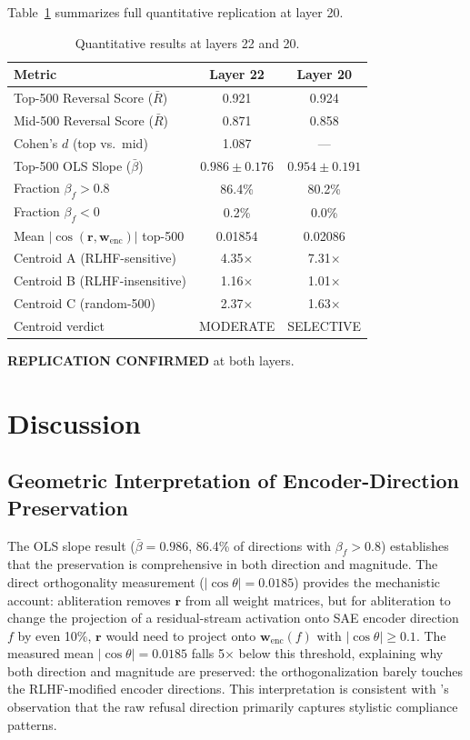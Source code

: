 \documentclass[11pt,letterpaper]{article}
\begin{document}
Table~\ref{tab:replication} summarizes full quantitative replication at layer 20.

\begin{table}[!htbp]
  \centering
  \caption{Quantitative results at layers 22 and 20.}
  \label{tab:replication}
  \begin{tabular}{lcc}
    \toprule
    Metric & Layer 22 & Layer 20 \\
    \midrule
    Top-500 Reversal Score ($\bar{R}$)   & 0.921 & 0.924 \\
    Mid-500 Reversal Score ($\bar{R}$)   & 0.871 & 0.858 \\
    Cohen's $d$ (top vs.\ mid)           & 1.087 & --- \\
    Top-500 OLS Slope ($\bar{\beta}$)    & $0.986 \pm 0.176$ & $0.954 \pm 0.191$ \\
    Fraction $\beta_f > 0.8$             & 86.4\% & 80.2\% \\
    Fraction $\beta_f < 0$               & 0.2\%  & 0.0\%  \\
    Mean $|\cos(\mathbf{r}, \mathbf{w}_{\text{enc}})|$ top-500 & 0.01854 & 0.02086 \\
    Centroid A (RLHF-sensitive)          & 4.35$\times$ & 7.31$\times$ \\
    Centroid B (RLHF-insensitive)        & 1.16$\times$ & 1.01$\times$ \\
    Centroid C (random-500)              & 2.37$\times$ & 1.63$\times$ \\
    Centroid verdict                     & MODERATE & SELECTIVE \\
    \bottomrule
  \end{tabular}
\end{table}

\noindent\textbf{REPLICATION CONFIRMED} at both layers.

\section{Discussion}

\subsection{Geometric Interpretation of Encoder-Direction Preservation}

The OLS slope result ($\bar{\beta} = 0.986$, 86.4\% of directions with $\beta_f > 0.8$) establishes
that the preservation is comprehensive in both direction and magnitude. The direct orthogonality
measurement ($|\cos\theta| = 0.0185$) provides the mechanistic account: abliteration removes
$\mathbf{r}$ from all weight matrices, but for abliteration to change the projection of a
residual-stream activation onto SAE encoder direction $f$ by even 10\%, $\mathbf{r}$ would need to
project onto $\mathbf{w}_{\text{enc}}(f)$ with $|\cos\theta| \geq 0.1$. The measured mean
$|\cos\theta| = 0.0185$ falls 5$\times$ below this threshold, explaining why both direction and
magnitude are preserved: the orthogonalization barely touches the RLHF-modified encoder directions.
This interpretation is consistent with \citeauthor{Cristofano2026}'s observation \citep{Cristofano2026}
that the raw refusal direction primarily captures stylistic compliance patterns.
\end{document}
